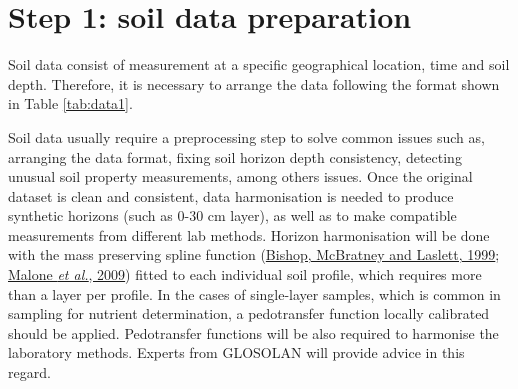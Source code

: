 \documentclass[
  10pt,
  b5paper,
  oneside]{book}
\begin{document}
\hypertarget{step-1-soil-data-preparation}{%
\chapter{Step 1: soil data preparation}\label{step-1-soil-data-preparation}}

Soil data consist of measurement at a specific geographical location, time and soil depth. Therefore, it is necessary to arrange the data following the format shown in Table \ref{tab:data1}.

\begin{table}[htbp]
    \caption{Format example of a soil dataset}
\end{table}

Soil data usually require a preprocessing step to solve common issues such as, arranging the data format, fixing soil horizon depth consistency, detecting unusual soil property measurements, among others issues.
Once the original dataset is clean and consistent, data harmonisation is needed to produce synthetic horizons (such as 0-30 cm layer), as well as to make compatible measurements from different lab methods. Horizon harmonisation will be done with the mass preserving spline function (\protect\hyperlink{ref-Bishop1999}{Bishop, McBratney and Laslett, 1999}; \protect\hyperlink{ref-Malone2009}{Malone \emph{et al.}, 2009}) fitted to each individual soil profile, which requires more than a layer per profile. In the cases of single-layer samples, which is common in sampling for nutrient determination, a pedotransfer function locally calibrated should be applied. Pedotransfer functions will be also required to harmonise the laboratory methods. Experts from GLOSOLAN will provide advice in this regard.
\end{document}

